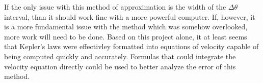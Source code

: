 %
If the only issue with this method of approximation is the width of the $\Delta\theta$ interval, than it should work
fine with a more powerful computer. If, however, it is a more fundamental issue with the method which was somehow
overlooked, more work will need to be done. Based on this project alone, it at least seems that Kepler's laws were
effectivley formatted into equations of velocity capable of being computed quickly and accurately. Formulas that
could integrate the velocity equation directly could be used to better analyze the error of this method.
%
